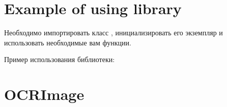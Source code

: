 \documentclass[letterpaper,10pt,russian]{sphinxmanual}
\begin{document}
\chapter{Example of using library}
\label{\detokenize{UsingExample:example-of-using-library}}\label{\detokenize{UsingExample::doc}}
Необходимо импортировать класс {\hyperref[\detokenize{OCRImage:image.OCRImage}]{}}, инициализировать его экземпляр и использовать необходимые вам функции.

Пример использования библиотеки:

\begin{sphinxVerbatim}[commandchars=\\\{\}]
   

  
\end{sphinxVerbatim}


\chapter{OCRImage}
\label{\detokenize{OCRImage:ocrimage}}\label{\detokenize{OCRImage::doc}}
\end{document}
